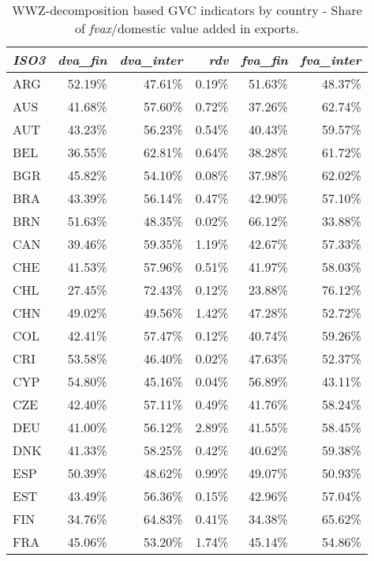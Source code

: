 \documentclass[a4paper,11pt]{article}
\begin{document}
\begin{table}[h]\small
  \centering
       \caption{WWZ-decomposition based GVC indicators by country - Share of \emph{fvax}/domestic value added in exports.}
    \begin{tabular}{lrrrrr}
    \toprule
        \textit{ISO3} & \textit{dva\_fin} & \textit{dva\_inter} & \textit{rdv} & \textit{fva\_fin} & \textit{fva\_inter}  \\
    \midrule
     ARG   & 52.19\% & 47.61\% & 0.19\% & 51.63\% & 48.37\% \\
    AUS   & 41.68\% & 57.60\% & 0.72\% & 37.26\% & 62.74\% \\
    AUT   & 43.23\% & 56.23\% & 0.54\% & 40.43\% & 59.57\% \\
    BEL   & 36.55\% & 62.81\% & 0.64\% & 38.28\% & 61.72\% \\
    BGR   & 45.82\% & 54.10\% & 0.08\% & 37.98\% & 62.02\% \\
    BRA   & 43.39\% & 56.14\% & 0.47\% & 42.90\% & 57.10\% \\
    BRN   & 51.63\% & 48.35\% & 0.02\% & 66.12\% & 33.88\% \\
    CAN   & 39.46\% & 59.35\% & 1.19\% & 42.67\% & 57.33\% \\
    CHE   & 41.53\% & 57.96\% & 0.51\% & 41.97\% & 58.03\% \\
    CHL   & 27.45\% & 72.43\% & 0.12\% & 23.88\% & 76.12\% \\
    CHN   & 49.02\% & 49.56\% & 1.42\% & 47.28\% & 52.72\% \\
    COL   & 42.41\% & 57.47\% & 0.12\% & 40.74\% & 59.26\% \\
    CRI   & 53.58\% & 46.40\% & 0.02\% & 47.63\% & 52.37\% \\
    CYP   & 54.80\% & 45.16\% & 0.04\% & 56.89\% & 43.11\% \\
    CZE   & 42.40\% & 57.11\% & 0.49\% & 41.76\% & 58.24\% \\
    DEU   & 41.00\% & 56.12\% & 2.89\% & 41.55\% & 58.45\% \\
    DNK   & 41.33\% & 58.25\% & 0.42\% & 40.62\% & 59.38\% \\
    ESP   & 50.39\% & 48.62\% & 0.99\% & 49.07\% & 50.93\% \\
    EST   & 43.49\% & 56.36\% & 0.15\% & 42.96\% & 57.04\% \\
    FIN   & 34.76\% & 64.83\% & 0.41\% & 34.38\% & 65.62\% \\
    FRA   & 45.06\% & 53.20\% & 1.74\% & 45.14\% & 54.86\% \\

\end{tabular}
\end{table}
\end{document}
